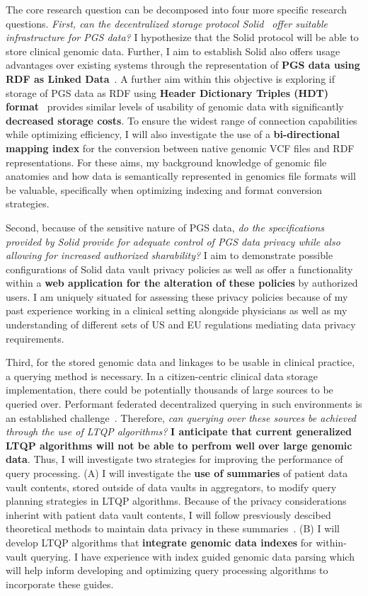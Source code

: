 \documentclass[a4paper,11pt]{article}
\begin{document}
\begin{refsection}
The core research question can be decomposed into four more specific research questions.
\textit{First, can the decentralized storage protocol Solid}~\cite{solid} \textit{offer suitable infrastructure for PGS data?} 
I hypothesize that the Solid protocol will be able to store clinical genomic data.
Further, I aim to establish Solid also offers usage advantages over existing systems through the representation of \textbf{PGS data using RDF as Linked Data}~\cite{berners-lee_linked_2009}.
A further aim within this objective is exploring if storage of PGS data as RDF using \textbf{Header Dictionary Triples (HDT) format}~\cite{hdt} provides similar levels of usability of genomic data with significantly \textbf{decreased storage costs}.
To ensure the widest range of connection capabilities while optimizing efficiency, I will also investigate the use of a \textbf{bi-directional mapping index} for the conversion between native genomic VCF files and RDF representations.
For these aims, my background knowledge of genomic file anatomies and how data is semantically represented in genomics file formats will be valuable, specifically when optimizing indexing and format conversion strategies.

Second, because of the sensitive nature of PGS data, \textit{do the specifications provided by Solid provide for adequate control of PGS data privacy while also allowing for increased authorized sharability?}
I aim to demonstrate possible configurations of Solid data vault privacy policies as well as offer a functionality within a \textbf{web application for the alteration of these policies} by authorized users.
I am uniquely situated for assessing these privacy policies because of my past experience working in a clinical setting alongside physicians as well as my understanding of different sets of US and EU regulations mediating data privacy requirements.

Third, for the stored genomic data and linkages to be usable in clinical practice, a querying method is necessary.
In a citizen-centric clinical data storage implementation, there could be potentially thousands of large sources to be queried over.
Performant federated decentralized querying in such environments is an established challenge~\cite{dang_fedshop_2023}.
Therefore, \textit{can querying over these sources be achieved through the use of LTQP algorithms?}
\textbf{I anticipate that current generalized LTQP algorithms will not be able to perfrom well over large genomic data}.
Thus, I will investigate two strategies for improving the performance of query processing.
(A) I will investigate the \textbf{use of summaries} of patient data vault contents, stored outside of data vaults in aggregators, to modify query planning strategies in LTQP algorithms.
Because of the privacy considerations inherint with patient data vault contents, I will follow presviously descibed theoretical methods to maintain data privacy in these summaries~\cite{taelman_privacyAgg_2020}.
(B) I will develop LTQP algorithms that \textbf{integrate genomic data indexes} for within-vault querying.
I have experience with index guided genomic data parsing which will help inform developing and optimizing query processing algorithms to incorporate these guides. 


\end{refsection}
\end{document}
